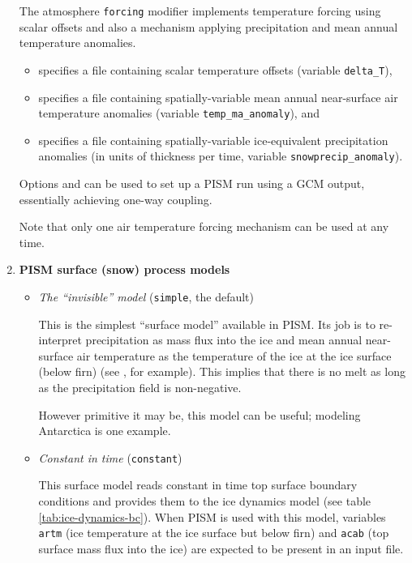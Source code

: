 \begin{enumerate}
  The atmosphere \texttt{forcing} modifier implements temperature forcing using scalar offsets and also a mechanism applying precipitation and mean annual temperature anomalies.
  \begin{itemize}
  \item {} specifies a file containing scalar temperature offsets (variable \texttt{delta_T}), 
  \item {} specifies a file containing spatially-variable mean annual near-surface air temperature anomalies (variable \texttt{temp_ma_anomaly}), and
  \item {} specifies a file containing spatially-variable ice-equivalent precipitation anomalies (in units of thickness per time, variable \texttt{snowprecip_anomaly}).
  \end{itemize}

  Options  and  can be used to set up a PISM run using a GCM output, essentially achieving one-way coupling.

  Note that only one air temperature forcing mechanism can be used at any time.

\item \textbf{PISM surface (snow) process models}
  \begin{itemize}
  \item \emph{The ``invisible'' model} (\texttt{simple}, the default)

    This is the simplest ``surface model'' available in PISM. Its job is to re-interpret  precipitation as mass flux into the ice and mean annual near-surface air temperature as the temperature of the ice at the ice surface (below firn) (see \cite{Hock05}, for example). This implies that there is no melt as long as the precipitation field  is non-negative.

    However primitive it may be, this model can be useful; modeling Antarctica is one example.
  \item \emph{Constant in time} (\texttt{constant})

    This surface model reads constant in time top surface boundary conditions and provides them to the ice dynamics model (see table \ref{tab:ice-dynamics-bc}). When PISM is used with this model, variables \texttt{artm} (ice temperature at the ice surface but below firn) and \texttt{acab} (top surface mass flux into the ice) are expected to be present in an input file.


\end{itemize}
\end{enumerate}

